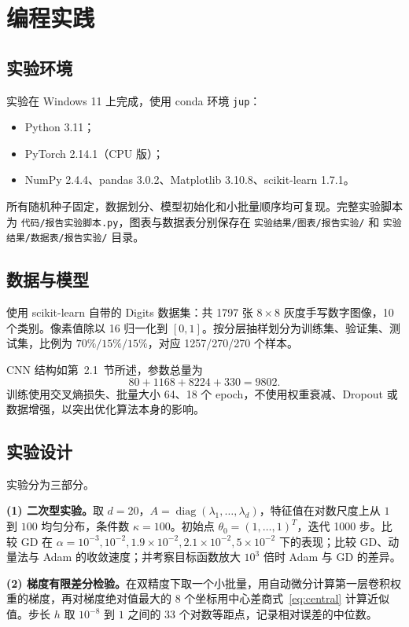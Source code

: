 \documentclass[12pt,a4paper]{ctexart}
\begin{document}
\section{编程实践}

\subsection{实验环境}
实验在 Windows 11 上完成，使用 conda 环境 \texttt{jup}：
\begin{itemize}[itemsep=0.2em]
\item Python 3.11；
\item PyTorch 2.14.1（CPU 版）；
\item NumPy 2.4.4、pandas 3.0.2、Matplotlib 3.10.8、scikit-learn 1.7.1。
\end{itemize}
所有随机种子固定，数据划分、模型初始化和小批量顺序均可复现。完整实验脚本为 \texttt{代码/报告实验脚本.py}，图表与数据表分别保存在 \texttt{实验结果/图表/报告实验/} 和 \texttt{实验结果/数据表/报告实验/} 目录。

\subsection{数据与模型}
使用 scikit-learn 自带的 Digits 数据集：共 1797 张 $8\times8$ 灰度手写数字图像，10 个类别。像素值除以 16 归一化到 $[0,1]$。按分层抽样划分为训练集、验证集、测试集，比例为 $70\%/15\%/15\%$，对应 1257/270/270 个样本。

CNN 结构如第~2.1~节所述，参数总量为
\[
80+1168+8224+330=9802.
\]
训练使用交叉熵损失、批量大小 64、18 个 epoch，不使用权重衰减、Dropout 或数据增强，以突出优化算法本身的影响。

\subsection{实验设计}
实验分为三部分。

\textbf{(1) 二次型实验。}取 $d=20$，$A=\operatorname{diag}(\lambda_1,\ldots,\lambda_d)$，特征值在对数尺度上从 $1$ 到 $100$ 均匀分布，条件数 $\kappa=100$。初始点 $\theta_0=(1,\ldots,1)^T$，迭代 1000 步。比较 GD 在 $\alpha=10^{-3},10^{-2},1.9\times10^{-2},2.1\times10^{-2},5\times10^{-2}$ 下的表现；比较 GD、动量法与 Adam 的收敛速度；并考察目标函数放大 $10^3$ 倍时 Adam 与 GD 的差异。

\textbf{(2) 梯度有限差分检验。}在双精度下取一个小批量，用自动微分计算第一层卷积权重的梯度，再对梯度绝对值最大的 8 个坐标用中心差商式~\eqref{eq:central} 计算近似值。步长 $h$ 取 $10^{-8}$ 到 $1$ 之间的 33 个对数等距点，记录相对误差的中位数。
\end{document}
